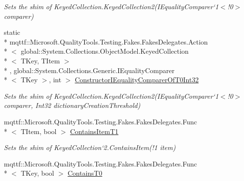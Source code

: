 \begin{DoxyCompactItemize}
\begin{DoxyCompactList}\small\item\em Sets the shim of Keyed\-Collection{.\-Keyed\-Collection}2(I\-Equality\-Comparer`1$<$!0$>$ comparer)\end{DoxyCompactList}\item 
static \\*
mqttf\-::\-Microsoft.\-Quality\-Tools.\-Testing.\-Fakes.\-Fakes\-Delegates.\-Action\\*
$<$ global\-::\-System.\-Collections.\-Object\-Model.\-Keyed\-Collection\\*
$<$ T\-Key, T\-Item $>$\\*
, global\-::\-System.\-Collections.\-Generic.\-I\-Equality\-Comparer\\*
$<$ T\-Key $>$, int $>$ \hyperlink{class_system_1_1_collections_1_1_object_model_1_1_fakes_1_1_shim_keyed_collection_3_01_t_key_00_01_t_item_01_4_a1d4e93aa336cd01377e4ed0ccf1072dc}{Constructor\-I\-Equality\-Comparer\-Of\-T0\-Int32}
\begin{DoxyCompactList}\small\item\em Sets the shim of Keyed\-Collection{.\-Keyed\-Collection}2(I\-Equality\-Comparer`1$<$!0$>$ comparer, Int32 dictionary\-Creation\-Threshold)\end{DoxyCompactList}\item 
mqttf\-::\-Microsoft.\-Quality\-Tools.\-Testing.\-Fakes.\-Fakes\-Delegates.\-Func\\*
$<$ T\-Item, bool $>$ \hyperlink{class_system_1_1_collections_1_1_object_model_1_1_fakes_1_1_shim_keyed_collection_3_01_t_key_00_01_t_item_01_4_a8b7be776d7bbf7235e9d702a1370a608}{Contains\-Item\-T1}
\begin{DoxyCompactList}\small\item\em Sets the shim of Keyed\-Collection`2.Contains\-Item(!1 item)\end{DoxyCompactList}\item 
mqttf\-::\-Microsoft.\-Quality\-Tools.\-Testing.\-Fakes.\-Fakes\-Delegates.\-Func\\*
$<$ T\-Key, bool $>$ \hyperlink{class_system_1_1_collections_1_1_object_model_1_1_fakes_1_1_shim_keyed_collection_3_01_t_key_00_01_t_item_01_4_a974e3201ff6ce5bceb88849de39cc454}{Contains\-T0}

\end{DoxyCompactItemize}

